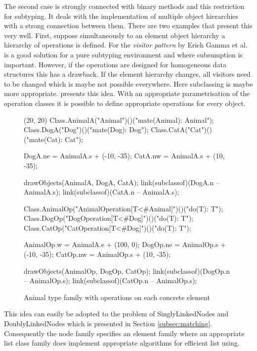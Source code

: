 The second case is strongly connected with binary methods and this
restriction for subtyping. It deals with the implementation of multiple
object hierarchies with a strong connection between them. There are two
examples that present this very well. First, suppose simultaneously to
an element object hierarchy a hierarchy of operations is defined. For
the \emph{visitor pattern} by Erich Gamma et al. \cite{gamma_design_1995}
is a good solution for a pure subtyping environment and where subsumption
is important. However, if the operations are designed for homogeneous
data structures this has a drawback. If the element hierarchy changes, all
visitors need to be changed which is maybe not possible everywhere. Here
subclassing is maybe more appropriate. 
presents this idea. With an appropriate parametrisation of the operation
classes it is possible to define appropriate operations for every object.

\begin{figure}[H]
	\centering
	\begin{emp}[classdiag](20, 20)
		Class.AnimalA("Animal")()("mate(Animal): Animal");
		Class.DogA("Dog")()("mate(Dog): Dog");
		Class.CatA("Cat")()("mate(Cat): Cat");

		DogA.ne = AnimalA.s + (-10, -35);
		CatA.nw = AnimalA.s + (10, -35);

		drawObjects(AnimalA, DogA, CatA);
		link(subclassof)(DogA.n -- AnimalA.s);
		link(subclassof)(CatA.n -- AnimalA.s);

		Class.AnimalOp("AnimalOperation[T<#Animal]")()("do(T): T");
		Class.DogOp("DogOperation[T<#Dog]")()("do(T): T");
		Class.CatOp("CatOperation[T<#Dog]")()("do(T): T");

		AnimalOp.w = AnimalA.e + (100, 0);
		DogOp.ne = AnimalOp.s + (-10, -35);
		CatOp.nw = AnimalOp.s + (10, -35);

		drawObjects(AnimalOp, DogOp, CatOp);
		link(subclassof)(DogOp.n -- AnimalOp.s);
		link(subclassof)(CatOp.n -- AnimalOp.s);
	\end{emp}
	\caption{Animal type family with operations on each concrete element}
	\label{fig:operationFamily}
\end{figure}

This idea can easily be adopted to the problem of SinglyLinkedNodes
and DoublyLinkedNodes which is presented in Section
\ref{subsec:matching}. Consequently the node family specifies an element
family where an appropriate list class family does implement appropriate
algorithms for efficient list using.


